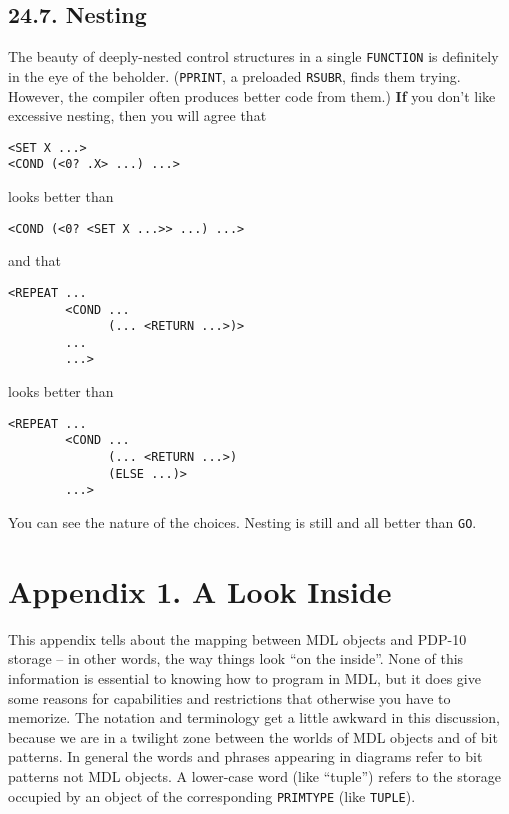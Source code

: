 \documentclass[a4paper,]{article}
\begin{document}
\subsection{24.7. Nesting}\label{nesting}

The beauty of deeply-nested control structures in a single \texttt{FUNCTION} is definitely in the eye of the beholder.
(\texttt{PPRINT}, a preloaded \texttt{RSUBR}, finds them trying. However, the compiler often produces better code from
them.) \textbf{If} you don't like excessive nesting, then you will agree that

\begin{verbatim}
<SET X ...>
<COND (<0? .X> ...) ...>
\end{verbatim}

looks better than

\begin{verbatim}
<COND (<0? <SET X ...>> ...) ...>
\end{verbatim}

and that

\begin{verbatim}
<REPEAT ...
        <COND ...
              (... <RETURN ...>)>
        ...
        ...>
\end{verbatim}

looks better than

\begin{verbatim}
<REPEAT ...
        <COND ...
              (... <RETURN ...>)
              (ELSE ...)>
        ...>
\end{verbatim}

You can see the nature of the choices. Nesting is still and all better than \texttt{GO}.

\section{Appendix 1. A Look Inside}\label{appendix-1.-a-look-inside}

This appendix tells about the mapping between MDL objects and PDP-10 storage -- in other words, the way things look ``on
the inside''. None of this information is essential to knowing how to program in MDL, but it does give some reasons for
capabilities and restrictions that otherwise you have to memorize. The notation and terminology get a little awkward in
this discussion, because we are in a twilight zone between the worlds of MDL objects and of bit patterns. In general the
words and phrases appearing in diagrams refer to bit patterns not MDL objects. A lower-case word (like ``tuple'') refers to
the storage occupied by an object of the corresponding \texttt{PRIMTYPE} (like \texttt{TUPLE}).
\end{document}
